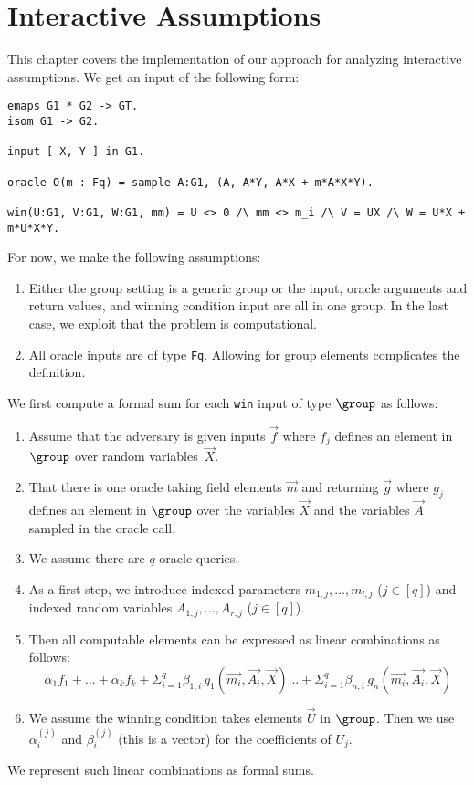 \chapter{Interactive Assumptions}

This chapter covers the implementation of our approach for
analyzing interactive assumptions.
%
We get an input of the following form:
\begin{verbatim}
emaps G1 * G2 -> GT.
isom G1 -> G2.

input [ X, Y ] in G1.

oracle O(m : Fq) = sample A:G1, (A, A*Y, A*X + m*A*X*Y).

win(U:G1, V:G1, W:G1, mm) = U <> 0 /\ mm <> m_i /\ V = UX /\ W = U*X + m*U*X*Y.
\end{verbatim}
%
For now, we make the following assumptions:
\begin{enumerate}
\item Either the group setting is a generic group or the input, oracle
  arguments and return values, and winning condition input
  are all in one group. In the last case, we exploit that the
  problem is computational.
\item All oracle inputs are of type \verb!Fq!. Allowing for group
  elements complicates the definition.
\end{enumerate}
%
We first compute a formal sum for each \verb!win! input of type $\group$
  as follows:
\begin{enumerate}
\item Assume that the adversary is given inputs
  $\vec{f}$ where $f_j$ defines an element in
  $\group$ over random variables~$\vec{X}$.
\item That there is one oracle taking field elements
  $\vec{m}$ and returning $\vec{g}$
  where $g_j$ defines an element in $\group$
  over the variables $\vec{X}$ and the variables
  $\vec{A}$ sampled in the oracle call.
\item We assume there are $q$ oracle queries.
\item As a first step, we introduce indexed parameters
  $m_{1,j},\ldots,m_{l,j}$ ($j \in [q]$) and
  indexed random variables
  $A_{1,j},\ldots,A_{r,j}$ ($j \in [q]$).
\item Then all computable elements can
  be expressed as linear combinations as follows:
  \[
    \alpha_1 f_1 + \ldots + \alpha_k f_k
    + \Sigma_{i=1}^q \beta_{1,i}\, g_1(\vec{m_i},\vec{A_i},\vec{X})
    \ldots
    + \Sigma_{i=1}^q \beta_{n,i}\, g_n(\vec{m_i},\vec{A_i},\vec{X})
  \]
\item We assume the winning condition takes
  elements $\vec{U}$ in $\group$.
  Then we use $\alpha_i^{(j)}$ and $\beta_i^{(j)}$ (this is a vector) for 
  the coefficients of $U_j$.
\end{enumerate}

We represent such linear combinations as formal sums.